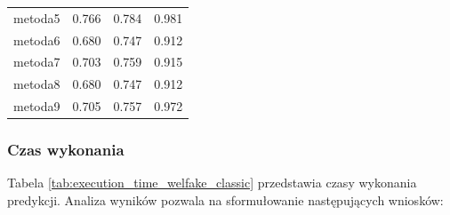 \begin{table}[H]
\begin{tabular}{lccc}
		metoda5           & 0.766         & 0.784            & 0.981          \\
		metoda6           & 0.680         & 0.747            & 0.912          \\
		metoda7           & 0.703         & 0.759            & 0.915          \\
		metoda8           & 0.680         & 0.747            & 0.912          \\
		metoda9           & 0.705         & 0.757            & 0.972          \\
		\bottomrule
	\end{tabular}
\end{table}

\subsubsection{Czas wykonania}
Tabela \ref{tab:execution_time_welfake_classic} przedstawia czasy wykonania predykcji. Analiza wyników pozwala na sformułowanie następujących wniosków:

